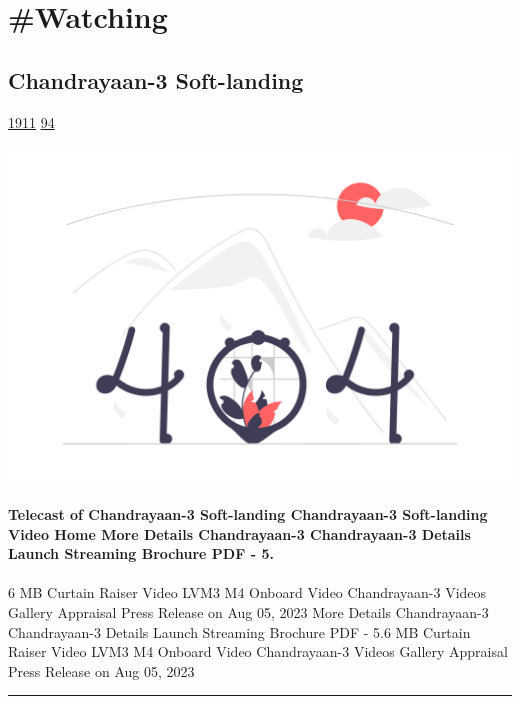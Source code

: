 \documentclass[10pt,a4paper]{article}
\begin{document}
\newpage
\section{\#Watching}

\begin{multicols*}{2}

\noindent\begin{minipage}{\linewidth}
\subsection{Chandrayaan-3 Soft-landing}
\textsc{\footnotesize
{\scriptsize\faThumbsOUp}\space 
\href{http://news.ycombinator.com/item?id=37233936\&utm\_term=comment}{1911} 
{\scriptsize\faComments}\space 
\href{http://news.ycombinator.com/item?id=37233936\&utm\_term=comment}{94} 
}
\par\medskip\noindent
\href{https://www.isro.gov.in/LIVE\_telecast\_of\_Soft\_landing.html?utm\_source=hackernewsletter\&utm\_medium=email\&utm\_term=watching}{
    \includegraphics[width=0.99\linewidth]{notfound.png}
}
\end{minipage}
\paragraph{}
\textbf{Telecast of Chandrayaan-3 Soft-landing Chandrayaan-3 Soft-landing Video Home More Details Chandrayaan-3 Chandrayaan-3 Details Launch Streaming Brochure PDF - 5.}
\paragraph{}
6 MB Curtain Raiser Video LVM3 M4 Onboard Video Chandrayaan-3 Videos Gallery Appraisal Press Release on Aug 05, 2023 More Details Chandrayaan-3 Chandrayaan-3 Details Launch Streaming Brochure PDF - 5.6 MB Curtain Raiser Video LVM3 M4 Onboard Video Chandrayaan-3 Videos Gallery Appraisal Press Release on Aug 05, 2023
\par\noindent\textcolor{red}{\rule{\linewidth}{0.2mm}}
\vfill
\null
\noindent\begin{minipage}{\linewidth}

\end{minipage}
\end{multicols*}
\end{document}
